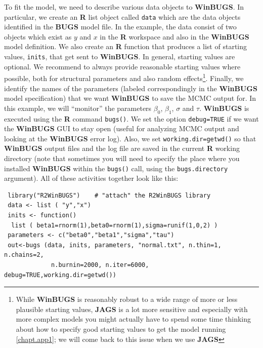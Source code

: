 To fit the model, we need to describe various data objects to {\bf
  WinBUGS}. In particular,
we create an {\bf R} list object called \mbox{\tt data} which
are the data objects identified in the {\bf BUGS} model file.
 In the example, the
data consist of two objects which exist as $y$ and $x$ in the {\bf R}
workspace and also in the {\bf WinBUGS} model definition.
 We also create an {\bf R} function
that produces a list of starting values, \mbox{\tt inits}, that get sent to
{\bf WinBUGS}. In general, starting
values are optional. We recommend to always provide reasonable
starting values where possible, both for structural parameters and
also random effects\footnote{While {\bf WinBUGS} is reasonably robust to a
  wide range of more or less plausible starting values, {\bf JAGS} is
  a lot more sensitive and especially with more complex models you
  might actually have to spend some time thinking about how to specify
  good starting values to get the model running \ref{chapt.app1}; we
  will come back to this issue when we use {\bf JAGS}}. 
 Finally, we identify
the names of the parameters (labeled correspondingly in the {\bf WinBUGS}
model specification) that we want {\bf WinBUGS} to save the MCMC output
for. In this example, we will ``monitor'' the parameters
$\beta_0$, $\beta_1$, $\sigma$ and $\tau$.
{\bf WinBUGS} is executed using the {\bf R} command
\mbox{\tt bugs()}.
We set the option \mbox{\tt debug=TRUE} if we want the {\bf WinBUGS}
GUI to stay open (useful for analyzing MCMC output and looking at the
{\bf WinBUGS} error log). Also, we set \mbox{\tt working.dir=getwd()}
so that {\bf WinBUGS} output files and the log file are saved in the
current {\bf R} working directory (note that sometimes you will need to specify the place where you installed {\bf WinBUGS} within the \mbox{\tt bugs()} call, using the \mbox{\tt bugs.directory} argument).
  All of these activities together look like this:
{\small
\begin{verbatim}
 library("R2WinBUGS")    # "attach" the R2WinBUGS library
 data <- list ( "y","x")
 inits <- function()
  list ( beta1=rnorm(1),beta0=rnorm(1),sigma=runif(1,0,2) )
 parameters <- c("beta0","beta1","sigma","tau")
 out<-bugs (data, inits, parameters, "normal.txt", n.thin=1, n.chains=2,
             n.burnin=2000, n.iter=6000, debug=TRUE,working.dir=getwd())
\end{verbatim}
}

